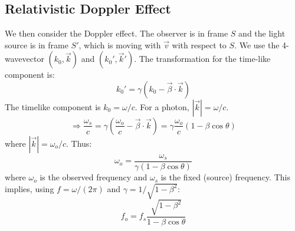 \documentclass{article}
\begin{document}
	\subsection*{Relativistic Doppler Effect}
	We then consider the Doppler effect.
	The observer is in frame $S$ and the light source is in frame $S'$, which is moving with $\vec{v}$ with respect to $S$.
	We use the 4-wavevector $(k_0, \vec{k})$ and $(k_0', \vec{k}')$. The transformation for the time-like component is:
	\begin{equation*}
		k_0' = \gamma(k_0 - \vec{\beta} \cdot \vec{k})
	\end{equation*}
	The timelike component is $k_0 = \omega/c$. For a photon, $|\vec{k}| = \omega/c$.
	\begin{equation*}
		\Rightarrow \frac{\omega_s}{c} = \gamma\left(\frac{\omega_o}{c} - \vec{\beta} \cdot \vec{k}\right) = \gamma \frac{\omega_o}{c} (1 - \beta \cos\theta)
	\end{equation*}
	where $|\vec{k}| = \omega_o/c$.
	Thus:
	\begin{equation}
		\omega_o = \frac{\omega_s}{\gamma(1-\beta\cos\theta)}
	\end{equation}
	where $\omega_o$ is the observed frequency and $\omega_s$ is the fixed (source) frequency.
	This implies, using $f = \omega / (2\pi)$ and $\gamma = 1/\sqrt{1-\beta^2}$:
	\begin{equation}
		f_o = f_s \frac{\sqrt{1-\beta^2}}{1-\beta\cos\theta}
	\end{equation}
	
\end{document}
